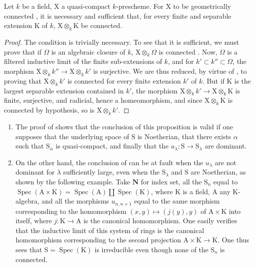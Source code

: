 \begin{corollary}[8.4.5]
\label{IV.8.4.5}
Let $k$ be a field, $\mathrm{X}$ a quasi-compact $k$-prescheme.
For $\mathrm{X}$ to be geometrically connected , it is necessary and sufficient that, for every finite and separable extension $\mathrm{K}$ of $k$, $\mathrm{X}\otimes_k\mathrm{K}$ be connected.
\end{corollary}

\begin{proof}
The condition is trivially necessary.
To see that it is sufficient, we must prove that if $\Omega$ is an algebraic closure of $k$, $\mathrm{X}\otimes_k\Omega$ is connected .
Now, $\Omega$ is a filtered inductive limit of the finite sub-extensions of $k$, and for $k'\subset k''\subset\Omega$, the morphism $\mathrm{X}\otimes_k k''\to\mathrm{X}\otimes_k k'$ is surjective.
We are thus reduced, by virtue of , to proving that $\mathrm{X}\otimes_k k'$ is connected for every finite extension $k'$ of $k$.
But if $\mathrm{K}$ is the largest separable extension contained in $k'$, the morphism $\mathrm{X}\otimes_k k'\to\mathrm{X}\otimes_k\mathrm{K}$ is finite, surjective, and radicial, hence  a homeomorphism, and since $\mathrm{X}\otimes_k\mathrm{K}$ is connected by hypothesis, so is $\mathrm{X}\otimes_k k'$.
\end{proof}

\begin{remark}[8.4.6]
\label{IV.8.4.6}
\begin{enumerate}[label=(\roman*)]
  \item The proof of  shows that the conclusion of this proposition is valid if one supposes that the underlying space of $\mathrm{S}$ is Noetherian, that there exists $\alpha$ such that $\mathrm{S}_\alpha$ is quasi-compact, and finally that the $u_\lambda:\mathrm{S}\to\mathrm{S}_\lambda$ are dominant.
  \item On the other hand, the conclusion of  can be at fault when the $u_\lambda$ are not dominant for $\lambda$ sufficiently large, even when the $\mathrm{S}_\lambda$ and $\mathrm{S}$ are Noetherian, as shown by the following example.
Take $\mathbf{N}$ for index set, all the $\mathrm{S}_n$ equal to $\operatorname{Spec}(\mathrm{A}\times\mathrm{K})=\operatorname{Spec}(\mathrm{A})\amalg\operatorname{Spec}(\mathrm{K})$, where $\mathrm{K}$ is a field, $\mathrm{A}$ any $\mathrm{K}$-algebra, and all the morphisms $u_{n,n+1}$ equal to the same morphism corresponding to the homomorphism $(x,y)\mapsto(j(y),y)$ of $\mathrm{A}\times\mathrm{K}$ into itself, where $j:\mathrm{K}\to\mathrm{A}$ is the canonical homomorphism.
One easily verifies that the inductive limit of this system of rings is the canonical homomorphism corresponding to the second projection $\mathrm{A}\times\mathrm{K}\to\mathrm{K}$.
One thus sees that $\mathrm{S}=\operatorname{Spec}(\mathrm{K})$ is irreducible even though none of the $\mathrm{S}_n$ is connected.
\end{enumerate}
\end{remark}

